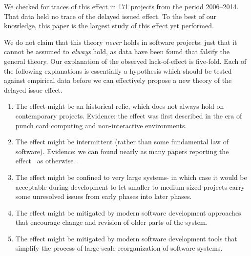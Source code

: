 \documentclass[smallcondensed]{svjour3}
\newcommand{\be}{\begin{enumerate}}
\newcommand{\ee}{\end{enumerate}}
\begin{document}
We checked for traces of this effect in 171 projects from the period 2006--2014.
That data held no trace of the delayed issued effect.
To the best of our knowledge, this paper is the  largest study
of this effect yet performed.

 


We do not claim that this theory {\em never} holds in software projects; just that it cannot be assumed to {\em always} hold, as data have been found that falsify the general theory. Our explanation of the observed lack-of-effect is five-fold. Each of the following explanations is essentially a hypothesis which should be tested against empirical data before we can effectively propose a new theory of the delayed issue effect.
\be
\item The effect might be an historical relic, which does not always hold on contemporary projects. Evidence:
the effect was first described in the era of punch card computing and non-interactive environments.
\item The effect might be intermittent (rather than some fundamental law of software). Evidence: we can  found nearly
as many papers reporting the effect~\cite{Boehm76,Boehm81,steck04,Fagan76,Stephenson76} as otherwise~\cite{Royce98,Boehm80,Shull02}.
\item The effect might be confined to very large systems- in which case it would be
acceptable during development to let smaller to medium
sized projects carry some unresolved issues from early phases into later phases.
\item The effect might be mitigated by modern software development approaches that
encourage change and revision of older parts of the system.
\item The effect might be mitigated by modern software development tools
that simplify the process of large-scale reorganization of software systems.
\ee
  
\end{document}
